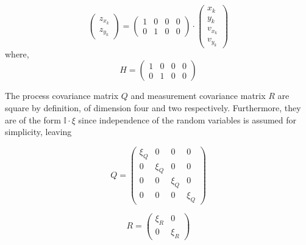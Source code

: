 \begin{equation}
\begin{pmatrix} z_{x_{k}} \\ z_{y_{k}} \end{pmatrix}=\begin{pmatrix}
1 & 0 & 0  & 0\\
0 & 1  & 0 & 0  \end{pmatrix} \cdot  \begin{pmatrix} x_k \\ y_k \\ v_{x_{k}} \\ v_{y_{k}}
\end{pmatrix}
\end{equation}
where,
\begin{equation}
H = 
\begin{pmatrix}
1 & 0 & 0  & 0\\
0 & 1  & 0 & 0 
\end{pmatrix}
\end{equation}

The process covariance matrix $Q$ and measurement covariance matrix $R$ are square by definition, of dimension four and two respectively. Furthermore, they are of the form $ \mathbb{I} \cdot \xi $ since independence of the random variables is assumed for simplicity, leaving


\begin{equation}
Q = 
\begin{pmatrix}
\xi_Q & 0 & 0  & 0\\
0 & \xi_Q  & 0 & 0\\
0 & 0  & \xi_Q  & 0\\
0 & 0  & 0  & \xi_Q 
\end{pmatrix}
\end{equation}

\begin{equation}
R = 
\begin{pmatrix}
\xi_R & 0 \\
0 & \xi_R 
\end{pmatrix}
\end{equation}

